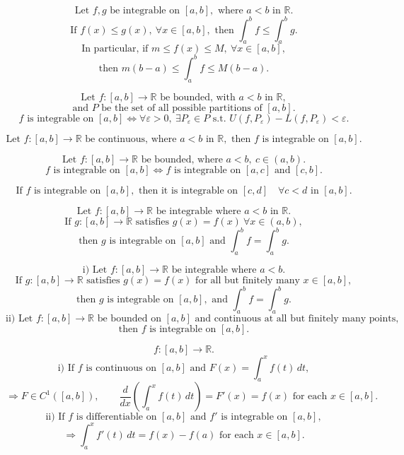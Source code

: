 \documentclass[11pt]{article}
\begin{document}
\[
\text{Let }f,g\text{ be integrable on }[a,b],\text{ where }a<b\text{ in }\mathbb R.
\]
\[
\text{If }f(x)\le g(x),\ \forall x\in[a,b],
\text{ then }\int_a^b f\le\int_a^b g.
\]
\[
\text{In particular, if }m\le f(x)\le M,\ \forall x\in[a,b],
\]
\[
\text{then }m(b-a)\le\int_a^b f\le M(b-a).
\]

\[
\text{Let }f:[a,b]\to\mathbb R\text{ be bounded, with }a<b\text{ in }\mathbb R,
\]
\[
\text{and }P\text{ be the set of all possible partitions of }[a,b].
\]
\[
f\text{ is integrable on }[a,b]
\Longleftrightarrow
\forall\varepsilon>0,\ \exists P_\varepsilon\in P
\text{ s.t. } U(f,P_\varepsilon)-L(f,P_\varepsilon)<\varepsilon.
\]

\newpage

\[
\text{Let }f:[a,b]\to\mathbb R\text{ be continuous, where }a<b\text{ in }\mathbb R,
\text{ then }f\text{ is integrable on }[a,b].
\]

\[
\text{Let }f:[a,b]\to\mathbb R\text{ be bounded, where }a<b,\ c\in(a,b).
\]
\[
f\text{ is integrable on }[a,b]
\Longleftrightarrow
f\text{ is integrable on }[a,c]\text{ and }[c,b].
\]

\[
\text{If }f\text{ is integrable on }[a,b],
\text{ then it is integrable on }[c,d]\quad \forall c<d\text{ in }[a,b].
\]

\[
\text{Let }f:[a,b]\to\mathbb R\text{ be integrable where }a<b\text{ in }\mathbb R.
\]
\[
\text{If }g:[a,b]\to\mathbb R\text{ satisfies }g(x)=f(x)\ \forall x\in(a,b),
\]
\[
\text{then }g\text{ is integrable on }[a,b]\text{ and }\int_a^b f=\int_a^b g.
\]

\[
\text{i) Let }f:[a,b]\to\mathbb R\text{ be integrable where }a<b.
\]
\[
\text{If }g:[a,b]\to\mathbb R\text{ satisfies }g(x)=f(x)\text{ for all but finitely many }x\in[a,b],
\]
\[
\text{then }g\text{ is integrable on }[a,b],\text{ and }\int_a^b f=\int_a^b g.
\]
\[
\text{ii) Let }f:[a,b]\to\mathbb R\text{ be bounded on }[a,b]\text{ and continuous at all but finitely many points,}
\]
\[
\text{then }f\text{ is integrable on }[a,b].
\]

\newpage


\[
f:[a,b]\to\mathbb R.
\]
\[
\text{i) If }f\text{ is continuous on }[a,b]\text{ and }F(x)=\int_a^x f(t)\,dt,
\]
\[
\Longrightarrow F\in C^1([a,b]),\qquad
\frac{d}{dx}\left(\int_a^x f(t)\,dt\right)=F'(x)=f(x)
\text{ for each }x\in[a,b].
\]
\[
\text{ii) If }f\text{ is differentiable on }[a,b]\text{ and }f'
\text{ is integrable on }[a,b],
\]
\[
\Longrightarrow
\int_a^x f'(t)\,dt=f(x)-f(a)
\text{ for each }x\in[a,b].
\]
\end{document}
